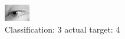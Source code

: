 \begin{figure}[h!]
\begin{center}
\includegraphics[width=0.60\columnwidth]{figures/ID2972_class_3_target_4.png}
\end{center}
\caption{ Classification: 3 actual target: 4}
\label{fig:ID2972_class_3_target_4}
\end{figure}
